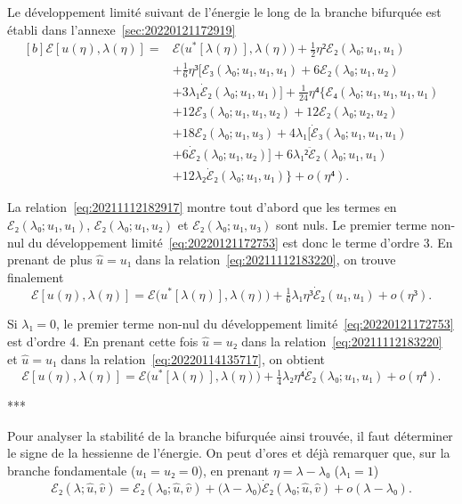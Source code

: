 \documentclass[12pt, final]{amsart}
\begin{document}
Le développement limité suivant de l'énergie le long de la branche bifurquée
est établi dans l'annexe~\ref{sec:20220121172919}
\begin{equation}
  \label{eq:20220121172753}
  \begin{aligned}[b]
    ℰ[u(η), λ(η)]={}&ℰ\bigl(u^*[λ(η)], λ(η)\bigr)
    +\tfrac12η²ℰ₂(λ₀; u₁, u₁)\\
    &+\tfrac16η³\bigl[ℰ₃(λ₀;u₁, u₁, u₁)+6ℰ₂(λ₀; u₁, u₂)\\
    &+3λ₁\dot{ℰ}₂(λ₀; u₁, u₁)\bigr]+\tfrac1{24}η⁴\bigl\{ℰ₄(λ₀;u₁, u₁, u₁, u₁)\\
    &+12ℰ₃(λ₀; u₁, u₁, u₂)+12ℰ₂(λ₀; u₂, u₂)\\
    &+18ℰ₂(λ₀; u₁, u₃)+4λ₁\bigl[\dot{ℰ}₃(λ₀; u₁, u₁, u₁)\\
    &+6\dot{ℰ}₂(λ₀; u₁, u₂)\bigr]+6λ₁²\ddot{ℰ}₂(λ₀; u₁, u₁)\\
    &+12λ₂\dot{ℰ}₂(λ₀; u₁, u₁)\bigr\}+o(η⁴).
  \end{aligned}
\end{equation}

La relation~\eqref{eq:20211112182917} montre tout d'abord que les termes en
\(ℰ₂(λ₀; u₁, u₁)\), \(ℰ₂(λ₀; u₁, u₂)\) et \(ℰ₂(λ₀; u₁, u₃)\) sont nuls. Le
premier terme non-nul du développement limité~\eqref{eq:20220121172753} est
donc le terme d'ordre 3. En prenant de plus \(\hat{u}=u₁\) dans la
relation~\eqref{eq:20211112183220}, on trouve finalement
\begin{equation}
  ℰ[u(η), λ(η)]=ℰ\bigl(u^*[λ(η)], λ(η)\bigr)+\tfrac16λ₁η³\dot{ℰ}₂(u₁, u₁)+o(η³).
\end{equation}

Si \(λ₁=0\), le premier terme non-nul du développement
limité~\eqref{eq:20220121172753} est d'ordre 4. En prenant cette fois
\(\hat{u}=u₂\) dans la relation~\eqref{eq:20211112183220} et \(\hat{u}=u₁\)
dans la relation~\eqref{eq:20220114135717}, on obtient
\begin{equation}
  ℰ[u(η), λ(η)]=ℰ\bigl(u^*[λ(η)], λ(η)\bigr)+\tfrac1{4}λ₂η⁴\dot{ℰ}₂(λ₀; u₁, u₁)+o(η⁴).
\end{equation}

\begin{center}
  ***
\end{center}

Pour analyser la stabilité de la branche bifurquée ainsi trouvée, il faut
déterminer le signe de la hessienne de l'énergie. On peut d'ores et déjà
remarquer que, sur la branche fondamentale (\(u₁=u₂=0\)), en prenant \(η=λ-λ₀\)
(\(λ₁=1\))
\begin{equation}
  ℰ₂(λ; \hat{u}, \hat{v})
  =ℰ₂(λ₀; \hat{u}, \hat{v})+\bigl(λ-λ₀\bigr)\dot{ℰ}₂(λ₀; \hat{u}, \hat{v})+o(λ-λ₀).
\end{equation}
\end{document}
